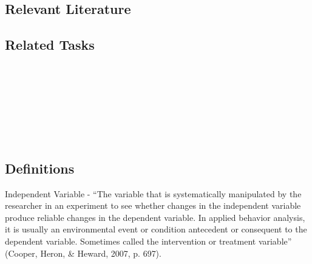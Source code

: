 \subsection{Relevant Literature}
\begin{refsection}
\nocite{cooper2007applied,baer1968some,johnston2010strategies}
\printbibliography[heading=none]
\end{refsection}
%
\subsection{Related Tasks} 
\fourbOne{}\\
\fourhFour{}\\
\fouriFive{}\\
\fourFKFour{}\\
\fourFKNine{}\\
\fourFKThirtyThree{}\\
%
%
%
%

\section[\fourbThree{}]{\fourbThree{}%
              }
              
              

\subsection{Definitions} 
Independent Variable - ``The variable that is systematically manipulated by the researcher in an experiment to see whether changes in the independent variable produce reliable changes in the dependent variable. In applied behavior analysis, it is usually an environmental event or condition antecedent or consequent to the dependent variable. Sometimes called the intervention or treatment variable'' (Cooper, Heron, \& Heward, 2007, p. 697).\\

